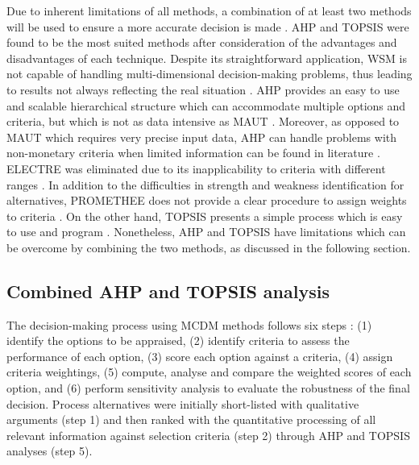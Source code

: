 Due to inherent limitations of all methods, a combination of at least two methods will be used to ensure a more accurate decision is made \cite{greco_multiple_2016}. AHP and TOPSIS were found to be the most suited methods after consideration of the advantages and disadvantages of each technique. Despite its straightforward application, WSM is not capable of handling multi-dimensional decision-making problems, thus leading to results not always reflecting the real situation \cite{pohekar_application_2004}. AHP provides an easy to use and scalable hierarchical structure which can accommodate multiple options and criteria, but which is not as data intensive as MAUT \cite{velasquez_analysis_2013}. Moreover, as opposed to MAUT which requires very precise input data, AHP can handle problems with non-monetary criteria when limited information can be found in literature \cite{great_britain_multi-criteria_2009}. ELECTRE was eliminated due to its inapplicability to criteria with different ranges \cite{greco_multiple_2016}. In addition to the difficulties in strength and weakness identification for alternatives, PROMETHEE does not provide a clear procedure to assign weights to criteria \cite{velasquez_analysis_2013}. On the other hand, TOPSIS presents a simple process which is easy to use and program \cite{velasquez_analysis_2013}. Nonetheless, AHP and TOPSIS have limitations which can be overcome by combining the two methods, as discussed in the following section.


\subsection{Combined AHP and TOPSIS analysis} %

The decision-making process using MCDM methods follows six steps \cite{great_britain_multi-criteria_2009}: (1) identify the options to be appraised, (2) identify criteria to assess the performance of each option, (3) score each option against a criteria, (4) assign criteria weightings, (5) compute, analyse and compare the weighted scores of each option, and (6) perform sensitivity analysis to evaluate the robustness of the final decision.
Process alternatives were initially short-listed with qualitative arguments (step 1) and then ranked with the quantitative processing of all relevant information against selection criteria (step 2) through AHP and TOPSIS analyses (step 5). 


